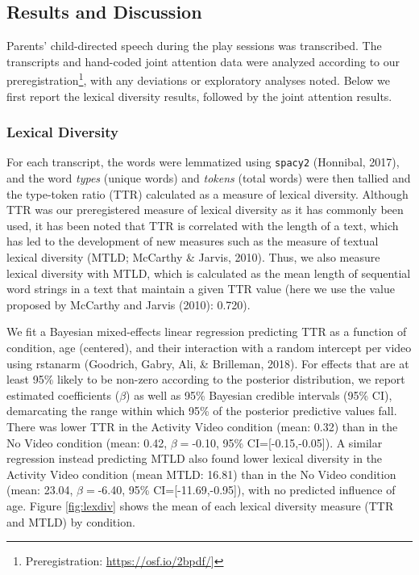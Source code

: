 \documentclass[man,floatsintext]{apa6}
\let\rmarkdownfootnote\footnote%
\def\footnote{\protect\rmarkdownfootnote}
\begin{document}
\hypertarget{results-and-discussion}{%
\subsection{Results and Discussion}\label{results-and-discussion}}

Parents' child-directed speech during the play sessions was transcribed.
The transcripts and hand-coded joint attention data were analyzed according to our preregistration\footnote{Preregistration: \url{https://osf.io/2bpdf/}{]}}, with any deviations or exploratory analyses noted.
Below we first report the lexical diversity results, followed by the joint attention results.

\hypertarget{lexical-diversity}{%
\subsubsection{Lexical Diversity}\label{lexical-diversity}}

For each transcript, the words were lemmatized using \texttt{spacy2} (Honnibal, 2017), and the word \emph{types} (unique words) and \emph{tokens} (total words) were then tallied and the type-token ratio (TTR) calculated as a measure of lexical diversity.
Although TTR was our preregistered measure of lexical diversity as it has commonly been used, it has been noted that TTR is correlated with the length of a text, which has led to the development of new measures such as the measure of textual lexical diversity (MTLD; McCarthy \& Jarvis, 2010).
Thus, we also measure lexical diversity with MTLD, which is calculated as the mean length of sequential word strings in a text that maintain a given TTR value (here we use the value proposed by McCarthy and Jarvis (2010): 0.720).

We fit a Bayesian mixed-effects linear regression predicting TTR as a function of condition, age (centered), and their interaction with a random intercept per video using rstanarm (Goodrich, Gabry, Ali, \& Brilleman, 2018).
For effects that are at least 95\% likely to be non-zero according to the posterior distribution, we report estimated coefficients (\(\beta\)) as well as 95\% Bayesian credible intervals (95\% CI), demarcating the range within which 95\% of the posterior predictive values fall.
There was lower TTR in the Activity Video condition (mean: 0.32) than in the No Video condition (mean: 0.42, \(\beta=\)-0.10, 95\% CI={[}-0.15,-0.05{]}).
A similar regression instead predicting MTLD also found lower lexical diversity in the Activity Video condition (mean MTLD: 16.81) than in the No Video condition (mean: 23.04, \(\beta=\)-6.40, 95\% CI={[}-11.69,-0.95{]}), with no predicted influence of age.
Figure \ref{fig:lexdiv} shows the mean of each lexical diversity measure (TTR and MTLD) by condition.
\end{document}
